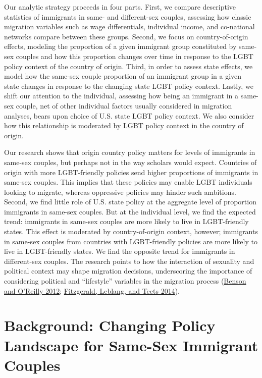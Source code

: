 \documentclass[
  11pt,
]{article}
\begin{document}
Our analytic strategy proceeds in four parts. First, we compare descriptive statistics of immigrants in same- and different-sex couples, assessing how classic migration variables such as wage differentials, individual income, and co-national networks compare between these groups. Second, we focus on country-of-origin effects, modeling the proportion of a given immigrant group constituted by same-sex couples and how this proportion changes over time in response to the LGBT policy context of the country of origin. Third, in order to assess state effects, we model how the same-sex couple proportion of an immigrant group in a given state changes in response to the changing state LGBT policy context. Lastly, we shift our attention to the individual, assessing how being an immigrant in a same-sex couple, net of other individual factors usually considered in migration analyses, bears upon choice of U.S. state LGBT policy context. We also consider how this relationship is moderated by LGBT policy context in the country of origin.

Our research shows that origin country policy matters for levels of immigrants in same-sex couples, but perhaps not in the way scholars would expect. Countries of origin with more LGBT-friendly policies send higher proportions of immigrants in same-sex couples. This implies that these policies may enable LGBT individuals looking to migrate, whereas oppressive policies may hinder such ambitions. Second, we find little role of U.S. state policy at the aggregate level of proportion immigrants in same-sex couples. But at the individual level, we find the expected trend: immigrants in same-sex couples are more likely to live in LGBT-friendly states. This effect is moderated by country-of-origin context, however; immigrants in same-sex couples from countries with LGBT-friendly policies are more likely to live in LGBT-friendly states. We find the opposite trend for immigrants in different-sex couples. The research points to how the interaction of sexuality and political context may shape migration decisions, underscoring the importance of considering political and ``lifestyle'' variables in the migration process (\protect\hyperlink{ref-benson_2012}{Benson and O'Reilly 2012}; \protect\hyperlink{ref-fitzgerald_2014}{Fitzgerald, Leblang, and Teets 2014}).

\hypertarget{background-changing-policy-landscape-for-same-sex-immigrant-couples}{%
\section{Background: Changing Policy Landscape for Same-Sex Immigrant Couples}\label{background-changing-policy-landscape-for-same-sex-immigrant-couples}}
\end{document}

